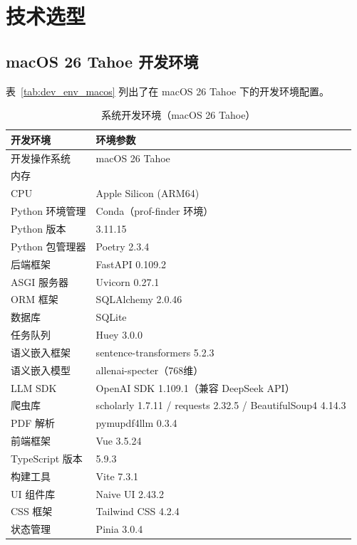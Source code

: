 \documentclass[11pt]{article}
\begin{document}
\section{技术选型}

\subsection{macOS 26 Tahoe 开发环境}

表~\ref{tab:dev_env_macos} 列出了在 macOS 26 Tahoe 下的开发环境配置。

\begin{table}[htbp]
  \centering
  \caption{系统开发环境（macOS 26 Tahoe）}
  \begin{tabular}{ll}
    \toprule
    开发环境 & 环境参数 \\
    \midrule
    开发操作系统 & macOS 26 Tahoe \\
    内存 & \\
    CPU & Apple Silicon (ARM64) \\
    Python 环境管理 & Conda（prof-finder 环境） \\
    Python 版本 & 3.11.15 \\
    Python 包管理器 & Poetry 2.3.4 \\
    后端框架 & FastAPI 0.109.2 \\
    ASGI 服务器 & Uvicorn 0.27.1 \\
    ORM 框架 & SQLAlchemy 2.0.46 \\
    数据库 & SQLite \\
    任务队列 & Huey 3.0.0 \\
    语义嵌入框架 & sentence-transformers 5.2.3 \\
    语义嵌入模型 & allenai-specter（768维） \\
    LLM SDK & OpenAI SDK 1.109.1（兼容 DeepSeek API） \\
    爬虫库 & scholarly 1.7.11 / requests 2.32.5 / BeautifulSoup4 4.14.3 \\
    PDF 解析 & pymupdf4llm 0.3.4 \\
    前端框架 & Vue 3.5.24 \\
    TypeScript 版本 & 5.9.3 \\
    构建工具 & Vite 7.3.1 \\
    UI 组件库 & Naive UI 2.43.2 \\
    CSS 框架 & Tailwind CSS 4.2.4 \\
    状态管理 & Pinia 3.0.4 \\

\end{tabular}
\end{table}
\end{document}
